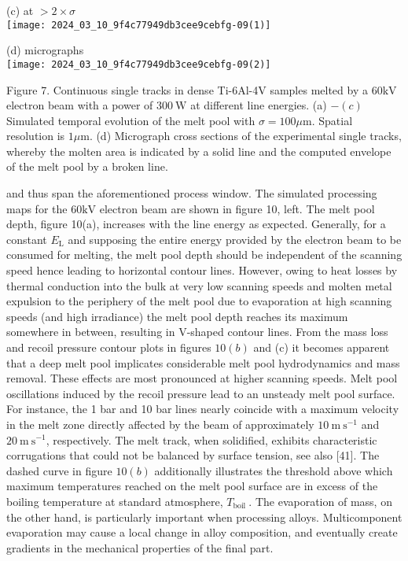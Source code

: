 \documentclass[10pt]{article}
\begin{document}
(c) at $>2 \times \sigma$\\
\texttt{[image: 2024\_03\_10\_9f4c77949db3cee9cebfg-09(1)]}

(d) micrographs\\
\texttt{[image: 2024\_03\_10\_9f4c77949db3cee9cebfg-09(2)]}

Figure 7. Continuous single tracks in dense Ti-6Al-4V samples melted by a $60 \mathrm{kV}$ electron beam with a power of $300 \mathrm{~W}$ at different line energies. (a) $-(c)$ Simulated temporal evolution of the melt pool with $\sigma=100 \mu \mathrm{m}$. Spatial resolution is $1 \mu \mathrm{m}$. (d) Micrograph cross sections of the experimental single tracks, whereby the molten area is indicated by a solid line and the computed envelope of the melt pool by a broken line.

and thus span the aforementioned process window. The simulated processing maps for the $60 \mathrm{kV}$ electron beam are shown in figure 10, left. The melt pool depth, figure 10(a), increases with the line energy as expected. Generally, for a constant $E_{\mathrm{L}}$ and supposing the entire energy provided by the electron beam to be consumed for melting, the melt pool depth should be independent of the scanning speed hence leading to horizontal contour lines. However, owing to heat losses by thermal conduction into the bulk at very low scanning speeds and molten metal expulsion to the periphery of the melt pool due to evaporation at high scanning speeds (and high irradiance) the melt pool depth reaches its maximum somewhere in between, resulting in V-shaped contour lines. From the mass loss and recoil pressure contour plots in figures $10(b)$ and (c) it becomes apparent that a deep melt pool implicates considerable melt pool hydrodynamics and mass removal. These effects are most pronounced at higher scanning speeds. Melt pool oscillations induced by the recoil pressure lead to an unsteady melt pool surface. For instance, the 1 bar and 10 bar lines nearly coincide with a maximum velocity in the melt zone directly affected by the beam of approximately $10 \mathrm{~m} \mathrm{~s}^{-1}$ and $20 \mathrm{~m} \mathrm{~s}^{-1}$, respectively. The melt track, when solidified, exhibits characteristic corrugations that could not be balanced by surface tension, see also [41]. The dashed curve in figure $10(b)$ additionally illustrates the threshold above which maximum temperatures reached on the melt pool surface are in excess of the boiling temperature at standard atmosphere, $T_{\text {boil }}$. The evaporation of mass, on the other hand, is particularly important when processing alloys. Multicomponent evaporation may cause a local change in alloy composition, and eventually create gradients in the mechanical properties of the final part.
\end{document}
